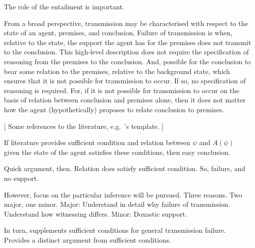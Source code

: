 \documentclass[10pt]{article}
\begin{document}
\begin{note}
  The role of the entailment is important.

  From a broad perspective, transmission may be characterised with respect to the state of an agent, premises, and conclusion.
  Failure of transmission is when, relative to the state, the support the agent has for the premises does not transmit to the conclusion.
  This high-level description does not require the specification of reasoning from the premises to the conclusion.
  And, possible for the conclusion to bear some relation to the premises, relative to the background state, which ensures that it is not possible for transmission to occur.
  If so, no specification of reasoning is required.
  For, if it is not possible for transmission to occur on the basis of relation between conclusion and premises alone, then it does not matter how the agent (hypothetically) proposes to relate conclusion to premises.

  {
    [
    \color{red}
    Some references to the literature, e.g.\ \citeauthor{Wright:2003aa}'s template.
    ]
  }

  If literature provides sufficient condition and relation between \(\psi\) and \(A(\psi)\) given the state of the agent satisfies these conditions, then easy conclusion.

  Quick argument, then.
  Relation does satisfy sufficient condition.
  So, failure, and no support.

  However, focus on the particular inference will be pursued.
  Three reasons.
  Two major, one minor.
  Major:
  Understand in detail why failure of transmission.
  Understand how witnessing differs.
  Minor:
  Doxastic support.

  In turn, supplements sufficient conditions for general transmission failure.
  Provides a distinct argument from sufficient conditions.
\end{note}
\end{document}
